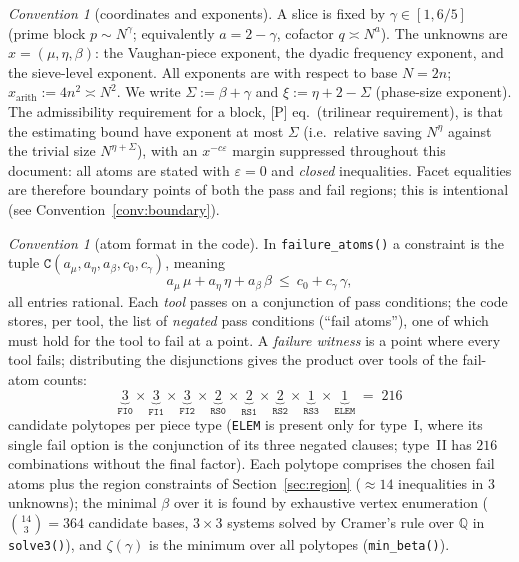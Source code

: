 \documentclass[11pt]{article}
\theoremstyle{remark}
\newtheorem{convention}[lemma]{Convention}
\newcommand{\N}{N}
\newcommand{\code}[1]{\texttt{#1}}
\begin{document}
\begin{convention}[coordinates and exponents]\label{conv:coords}
A slice is fixed by $\gamma\in[1,6/5]$ (prime block $p\sim
\N^{\gamma}$; equivalently $a=2-\gamma$, cofactor $q\asymp\N^{a}$). The
unknowns are $x=(\mu,\eta,\beta)$: the Vaughan-piece exponent, the dyadic
frequency exponent, and the sieve-level exponent. All exponents are with
respect to base $\N=2n$; $x_{\mathrm{arith}}:=4n^2\asymp\N^2$. We write
$\Sigma:=\beta+\gamma$ and $\xi:=\eta+2-\Sigma$ (phase-size exponent).
The admissibility requirement for a block, [P] eq.\ (trilinear
requirement), is that the estimating bound have exponent at most
$\Sigma$ (i.e.\ relative saving $\N^{\eta}$ against the trivial size
$\N^{\eta+\Sigma}$), with an $x^{-c\varepsilon}$ margin suppressed
throughout this document: all atoms are stated with $\varepsilon=0$ and
\emph{closed} inequalities. Facet equalities are therefore boundary
points of both the pass and fail regions; this is intentional (see
Convention~\ref{conv:boundary}).
\end{convention}

\begin{convention}[atom format in the code]\label{conv:atoms}
In \code{failure\_atoms()} a constraint is the tuple
$\code{C}(a_{\mu},a_{\eta},a_{\beta},c_0,c_{\gamma})$, meaning
\[
a_{\mu}\,\mu+a_{\eta}\,\eta+a_{\beta}\,\beta\ \le\ c_0+c_{\gamma}\,\gamma ,
\]
all entries rational. Each \emph{tool} passes on a conjunction of pass
conditions; the code stores, per tool, the list of \emph{negated} pass
conditions (``fail atoms''), one of which must hold for the tool to fail
at a point. A \emph{failure witness} is a point where every tool fails;
distributing the disjunctions gives the product over tools of the
fail-atom counts:
\[
\underbrace{3}_{\code{FI0}}\times
\underbrace{3}_{\code{FI1}}\times
\underbrace{3}_{\code{FI2}}\times
\underbrace{2}_{\code{RS0}}\times
\underbrace{2}_{\code{RS1}}\times
\underbrace{2}_{\code{RS2}}\times
\underbrace{1}_{\code{RS3}}\times
\underbrace{1}_{\code{ELEM}}\;=\;216
\]
candidate polytopes per piece type (\code{ELEM} is present only for
type~I, where its single fail option is the conjunction of its three
negated clauses; type~II has $216$ combinations without the final
factor). Each polytope comprises the chosen fail atoms plus the region
constraints of Section~\ref{sec:region} ($\approx14$ inequalities in $3$
unknowns); the minimal $\beta$ over it is found by exhaustive vertex
enumeration ($\binom{14}{3}=364$ candidate bases, $3\times3$ systems
solved by Cramer's rule over $\mathbb{Q}$ in \code{solve3()}), and
$\zeta(\gamma)$ is the minimum over all polytopes (\code{min\_beta()}).
\end{convention}
\end{document}

